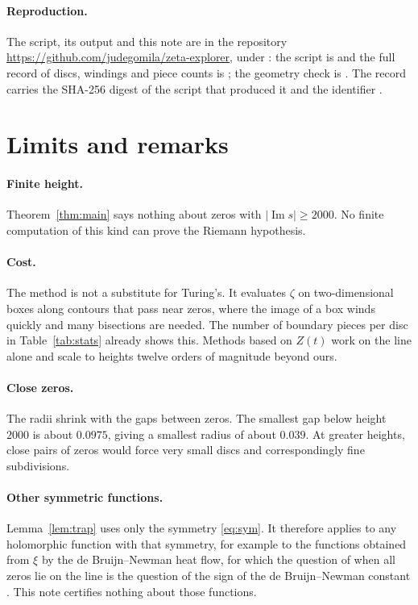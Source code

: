 \documentclass[11pt,a4paper]{article}
\theoremstyle{definition}
\DeclareMathOperator{\im}{Im}
\begin{document}
\paragraph{Reproduction.}
\sloppy
The script, its output and this note are in the repository
\url{https://github.com/judegomila/zeta-explorer}, under
: the script is
 and the full record of
discs, windings and piece counts is
; the geometry check is
. The record carries the
SHA-256 digest of the script that produced it and the identifier
.

\section{Limits and remarks}\label{sec:limits}

\paragraph{Finite height.}
Theorem~\ref{thm:main} says nothing about zeros with $|\im s|\ge2000$. No
finite computation of this kind can prove the Riemann hypothesis.

\paragraph{Cost.}
The method is not a substitute for Turing's. It evaluates $\zeta$ on
two-dimensional boxes along contours that pass near zeros, where the image of
a box winds quickly and many bisections are needed. The number of boundary
pieces per disc in Table~\ref{tab:stats} already shows this. Methods based on
$Z(t)$ work on the line alone and scale to heights twelve orders of magnitude
beyond ours.

\paragraph{Close zeros.}
The radii shrink with the gaps between zeros. The smallest gap below height
$2000$ is about $0.0975$, giving a smallest radius of about $0.039$. At
greater heights, close pairs of zeros would force very small discs and
correspondingly fine subdivisions.

\paragraph{Other symmetric functions.}
Lemma~\ref{lem:trap} uses only the symmetry \eqref{eq:sym}. It therefore
applies to any holomorphic function with that symmetry, for example to the
functions obtained from $\xi$ by the de Bruijn--Newman heat flow, for which
the question of when all zeros lie on the line is the question of the sign of
the de Bruijn--Newman constant \cite{RodgersTao}. This note certifies nothing
about those functions.
\end{document}
